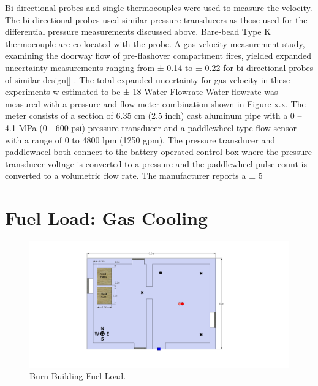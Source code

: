 \documentclass[12pt,oneside]{book}
\begin{document}
Bi-directional probes and single thermocouples were used to measure the velocity.  The bi-directional probes used similar pressure transducers as those used for the differential pressure measurements discussed above.   Bare-bead Type K thermocouple are co-located with the probe. A gas velocity measurement study, examining the doorway flow of pre-flashover compartment fires, yielded expanded uncertainty measurements ranging from ± 0.14 to ± 0.22 for bi-directional probes of similar design[] .  The total expanded uncertainty for gas velocity in these experiments w estimated to be  ± 18 %
Water Flowrate
Water flowrate was measured with a pressure and flow meter combination shown in Figure x.x. The meter consists of a section of 6.35 cm (2.5 inch) cast aluminum pipe with a 0 – 4.1 MPa (0 - 600 psi) pressure transducer and a paddlewheel type flow sensor with a range of 0 to 4800 lpm (1250 gpm). The pressure transducer and paddlewheel both connect to the battery operated control box where the pressure transducer voltage is converted to a pressure and the paddlewheel pulse count is converted to a volumetric flow rate.  The manufacturer reports a ± 5 %


\section{Fuel Load: Gas Cooling}
\label{sec:Fuel_Load:_Gas_Cooling} 

\begin{figure}[!ht]
	\includegraphics[width=6in]{../Figures/Pictures/DelCoBurnBuildingFuelLoad}
	\caption{Burn Building Fuel Load.}
	\label{fig:Burn_Building_Fuel_Load}
\end{figure}
\end{document}
